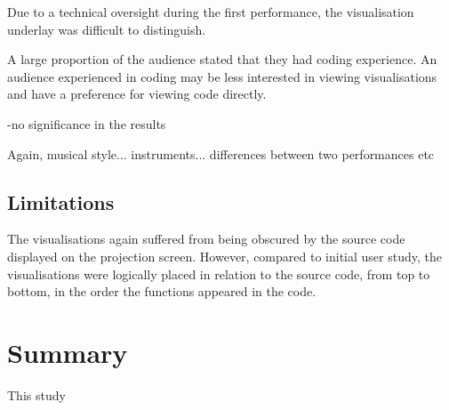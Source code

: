 Due to a technical oversight during the first performance, the visualisation underlay was difficult to distinguish. 

A large proportion of the audience stated that they had coding experience. An audience experienced in coding may be less interested in viewing visualisations and have a preference for viewing code directly.

-no significance in the results

Again, musical style... instruments... differences between two performances etc

\more

\subsection{Limitations}

The visualisations again suffered from being obscured by the source code displayed on the projection screen. However, compared to initial user study, the visualisations were logically placed in relation to the source code, from top to bottom, in the order the functions appeared in the code.

\section{Summary}

This study 
\more








